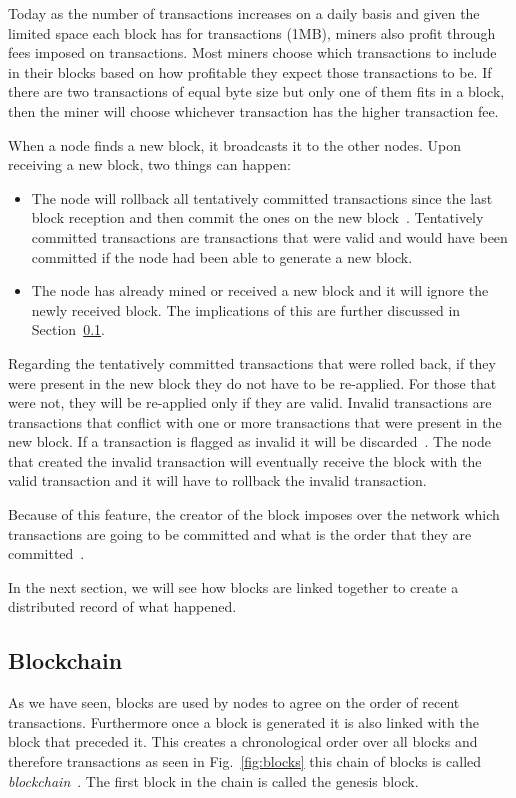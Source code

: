 Today as the number of transactions increases on a daily basis and given the limited space each block has for transactions (1MB), miners also profit through fees imposed on transactions. Most miners choose which transactions to include in their blocks based on how profitable they expect those transactions to be. If there are two transactions of equal byte size but only one of them fits in a block, then the miner will choose whichever transaction has the higher transaction fee.

When a node finds a new block, it broadcasts it to the other nodes. Upon receiving a new block, two things can happen:
\begin{itemize}
\item The node will rollback all tentatively committed transactions since the last block reception and then commit the ones on the new block~\cite{decker2013information}. Tentatively committed transactions are transactions that were valid and would have been committed if the node had been able to generate a new block.
\item The node has already mined or received a new block and it will ignore the newly received block. The implications of this are further discussed in Section~\ref{sec:blockchain}.
\end{itemize}

Regarding the tentatively committed transactions that were rolled back, if they were present in the new block they do not have to be re-applied. For those that were not, they will be re-applied only if they are valid. Invalid transactions are transactions that conflict with one or more transactions that were present in the new block. If a transaction is flagged as invalid it will be discarded~\cite{decker2013information}. The node that created the invalid transaction will eventually receive the block with the valid transaction and it will have to rollback the invalid transaction.

Because of this feature, the creator of the block imposes over the network which transactions are going to be committed and what is the order that they are committed~\cite{decker2013information}.

In the next section, we will see how blocks are linked together to create a distributed record of what happened.

\subsection{Blockchain}
\label{sec:blockchain}
As we have seen, blocks are used by nodes to agree on the order of recent transactions. Furthermore once a block is generated it is also linked with the block that preceded it. This creates a chronological order over all blocks and therefore transactions as seen in Fig.~\ref{fig:blocks} this chain of blocks is called \textit{blockchain}~\cite{decker2013information}. The first block in the chain is called the genesis block.

